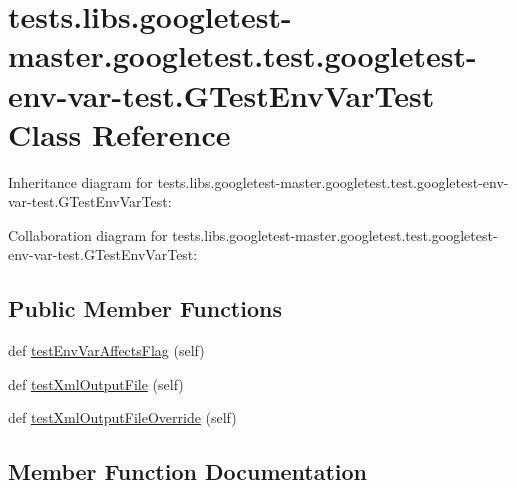 \hypertarget{classtests_1_1libs_1_1googletest-master_1_1googletest_1_1test_1_1googletest-env-var-test_1_1GTestEnvVarTest}{}\section{tests.\+libs.\+googletest-\/master.googletest.\+test.\+googletest-\/env-\/var-\/test.G\+Test\+Env\+Var\+Test Class Reference}
\label{classtests_1_1libs_1_1googletest-master_1_1googletest_1_1test_1_1googletest-env-var-test_1_1GTestEnvVarTest}


Inheritance diagram for tests.\+libs.\+googletest-\/master.googletest.\+test.\+googletest-\/env-\/var-\/test.G\+Test\+Env\+Var\+Test\+:


Collaboration diagram for tests.\+libs.\+googletest-\/master.googletest.\+test.\+googletest-\/env-\/var-\/test.G\+Test\+Env\+Var\+Test\+:
\subsection*{Public Member Functions}
\begin{DoxyCompactItemize}
\item 
def \hyperlink{classtests_1_1libs_1_1googletest-master_1_1googletest_1_1test_1_1googletest-env-var-test_1_1GTestEnvVarTest_aa59fda48de38248d48ec84b1fd75d9b5}{test\+Env\+Var\+Affects\+Flag} (self)
\item 
def \hyperlink{classtests_1_1libs_1_1googletest-master_1_1googletest_1_1test_1_1googletest-env-var-test_1_1GTestEnvVarTest_a3165399c958d586ee677cea0905c3d29}{test\+Xml\+Output\+File} (self)
\item 
def \hyperlink{classtests_1_1libs_1_1googletest-master_1_1googletest_1_1test_1_1googletest-env-var-test_1_1GTestEnvVarTest_ac75295fa3b78dc3695f2567e042aed8d}{test\+Xml\+Output\+File\+Override} (self)
\end{DoxyCompactItemize}


\subsection{Member Function Documentation}
\mbox{\label{classtests_1_1libs_1_1googletest-master_1_1googletest_1_1test_1_1googletest-env-var-test_1_1GTestEnvVarTest_aa59fda48de38248d48ec84b1fd75d9b5}} 
